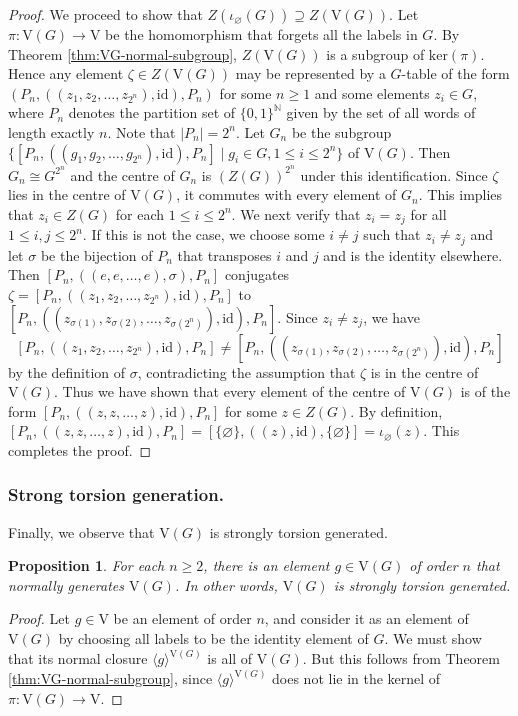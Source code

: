 \documentclass[10pt,a4paper]{amsart}
\numberwithin{equation}{section}
\numberwithin{figure}{section}
\newtheorem{prop}[thm]{Proposition}
\theoremstyle{definition}
\newcommand{\bN}{\mathbb{N}}
\newcommand{\V}{\mathrm{V}}
\renewcommand{\geq}{\geqslant}
\renewcommand{\leq}{\leqslant}
\begin{document}
\begin{proof}
We proceed to show that $Z(\iota_\varnothing(G))\supseteq Z(\V(G))$. Let $\pi \colon \V(G) \to \V$ be the homomorphism that forgets all the labels in $G$. By Theorem \ref{thm:VG-normal-subgroup}, $Z(\V(G))$ is a subgroup of $\mathrm{ker}{(\pi)}$. Hence any element $\zeta \in Z(\V(G))$ may be represented by a $G$-table of the form $(P_n,((z_1,z_2,\ldots, z_{2^n}),\mathrm{id}),P_n)$ for some $n\geq 1$ and some elements $z_i \in G$, where $P_n$ denotes the partition set of $\{0,1\}^\bN$ given by the set of all words of length exactly $n$. Note that $\lvert P_n \rvert = 2^n$. Let $G_n$ be the subgroup $\{[P_n,((g_1,g_2,\ldots, g_{2^n}),\mathrm{id}),P_n] \mid g_i\in G,1\leq i\leq 2^n \}$ of $\V(G)$. Then $G_n \cong G^{2^n}$ and the centre of $G_n$ is $(Z(G))^{2^n}$ under this identification. Since $\zeta$ lies in the centre of $\V(G)$, it commutes with every element of $G_n$. This implies that $z_i\in Z(G)$ for each $1\leq i\leq 2^n$. We next verify that $z_i = z_j$ for all $1\leq i,j\leq 2^n$. If this is not the case, we choose some $i\neq j$ such that $z_i \neq z_j$ and let $\sigma$ be the bijection of $P_n$ that transposes $i$ and $j$ and is the identity elsewhere. Then $[P_n,((e,e,\ldots, e),\sigma),P_n]$ conjugates $\zeta = [P_n,((z_1,z_2,\ldots, z_{2^n}),\mathrm{id}),P_n]$ to $[P_n,((z_{\sigma(1)},z_{\sigma(2)},\ldots, z_{\sigma(2^n)}),\mathrm{id}),P_n]$. Since $z_i\ne z_j$, we have
\[
[P_n,((z_1,z_2,\ldots, z_{2^n}),\mathrm{id}),P_n] \neq [P_n,((z_{\sigma(1)},z_{\sigma(2)},\ldots, z_{\sigma(2^n)}),\mathrm{id}),P_n]
\]
by the definition of $\sigma$, contradicting the assumption that $\zeta$ is in the centre of $\V(G)$. Thus we have shown that every element of the centre of $\V(G)$ is of the form $[P_n,((z,z,\ldots, z),\mathrm{id}),P_n]$ for some $z\in Z(G)$. By definition, $[P_n,((z,z,\ldots, z),\mathrm{id}),P_n] = [\{\varnothing\},((z),\mathrm{id}),\{\varnothing\}] = \iota_\varnothing(z)$. This completes the proof.
\end{proof}


\subsubsection*{Strong torsion generation.}
Finally, we observe that $\V(G)$ is strongly torsion generated.

\begin{prop}
\label{prop:torsion-VG}
For each $n\geq 2$, there is an element $g \in \V(G)$ of order $n$ that normally generates $\V(G)$. In other words, $\V(G)$ is strongly torsion generated.
\end{prop}
\begin{proof}
Let $g \in \V$ be an element of order $n$, and consider it as an element of $\V(G)$ by choosing all labels to be the identity element of $G$. We must show that its normal closure $\langle g \rangle^{\V(G)}$ is all of $\V(G)$. But this follows from Theorem \ref{thm:VG-normal-subgroup}, since $\langle g \rangle^{\V(G)}$ does not lie in the kernel of $\pi \colon \V(G) \to \V$.
\end{proof}
\end{document}
